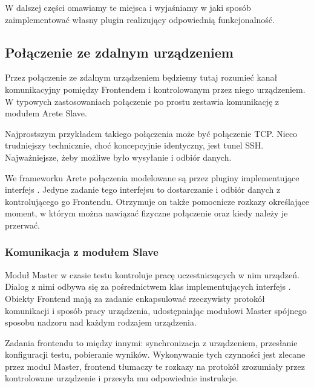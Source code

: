 \documentclass[00-praca-magisterska.tex]{subfiles}
\begin{document}
W dalszej części omawiamy te miejsca i wyjaśniamy w jaki sposób zaimplementować
własny plugin realizujący odpowiednią funkcjonalność.

\subsection{Połączenie ze zdalnym urządzeniem}


Przez połączenie ze zdalnym urządzeniem będziemy tutaj rozumieć kanał
komunikacyjny pomiędzy Frontendem i kontrolowanym przez niego urządzeniem. W
typowych zastosowaniach połączenie po prostu zestawia komunikację z modułem
Arete Slave. 


Najprostszym przykładem takiego połączenia może być połączenie TCP. Nieco
trudniejszy technicznie, choć koncepcyjnie identyczny, jest tunel SSH.
Najważniejsze, żeby możliwe było wysyłanie i odbiór danych.

We frameworku Arete połączenia modelowane są przez pluginy implementujące
interfejs . Jedyne zadanie tego interfejsu to
dostarczanie i odbiór danych z kontrolującego go Frontendu. Otrzymuje on także
pomocnicze rozkazy określające moment, w którym można nawiązać fizyczne
połączenie oraz kiedy należy je przerwać.


\subsubsection{Komunikacja z modułem Slave}

Moduł Master w czasie testu kontroluje pracę uczestniczących w nim urządzeń.
Dialog z nimi odbywa się za pośrednictwem klas implementujących interfejs
. Obiekty Frontend mają za zadanie enkapsulować rzeczywisty
protokół komunikacji i sposób pracy urządzenia, udostępniając modułowi Master
spójnego sposobu nadzoru nad każdym rodzajem urządzenia.

Zadania frontendu to między innymi: synchronizacja z urządzeniem, przesłanie
konfiguracji testu, pobieranie wyników. Wykonywanie tych czynności jest zlecane
przez moduł Master, frontend tłumaczy te rozkazy na protokół zrozumiały przez
kontrolowane urządzenie i przesyła mu odpowiednie instrukcje.
\end{document}
